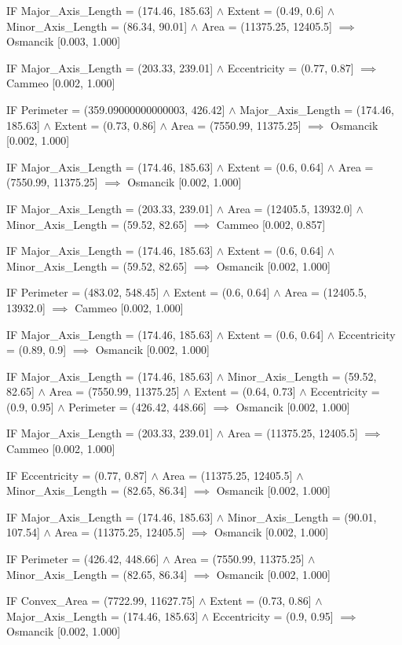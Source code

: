 IF Major\_Axis\_Length = (174.46, 185.63] $\land$ Extent = (0.49, 0.6] $\land$ Minor\_Axis\_Length = (86.34, 90.01] $\land$ Area = (11375.25, 12405.5] $\implies$ Osmancik [0.003, 1.000]

IF Major\_Axis\_Length = (203.33, 239.01] $\land$ Eccentricity = (0.77, 0.87] $\implies$ Cammeo [0.002, 1.000]

IF Perimeter = (359.09000000000003, 426.42] $\land$ Major\_Axis\_Length = (174.46, 185.63] $\land$ Extent = (0.73, 0.86] $\land$ Area = (7550.99, 11375.25] $\implies$ Osmancik [0.002, 1.000]

IF Major\_Axis\_Length = (174.46, 185.63] $\land$ Extent = (0.6, 0.64] $\land$ Area = (7550.99, 11375.25] $\implies$ Osmancik [0.002, 1.000]

IF Major\_Axis\_Length = (203.33, 239.01] $\land$ Area = (12405.5, 13932.0] $\land$ Minor\_Axis\_Length = (59.52, 82.65] $\implies$ Cammeo [0.002, 0.857]

IF Major\_Axis\_Length = (174.46, 185.63] $\land$ Extent = (0.6, 0.64] $\land$ Minor\_Axis\_Length = (59.52, 82.65] $\implies$ Osmancik [0.002, 1.000]

IF Perimeter = (483.02, 548.45] $\land$ Extent = (0.6, 0.64] $\land$ Area = (12405.5, 13932.0] $\implies$ Cammeo [0.002, 1.000]

IF Major\_Axis\_Length = (174.46, 185.63] $\land$ Extent = (0.6, 0.64] $\land$ Eccentricity = (0.89, 0.9] $\implies$ Osmancik [0.002, 1.000]

IF Major\_Axis\_Length = (174.46, 185.63] $\land$ Minor\_Axis\_Length = (59.52, 82.65] $\land$ Area = (7550.99, 11375.25] $\land$ Extent = (0.64, 0.73] $\land$ Eccentricity = (0.9, 0.95] $\land$ Perimeter = (426.42, 448.66] $\implies$ Osmancik [0.002, 1.000]

IF Major\_Axis\_Length = (203.33, 239.01] $\land$ Area = (11375.25, 12405.5] $\implies$ Cammeo [0.002, 1.000]

IF Eccentricity = (0.77, 0.87] $\land$ Area = (11375.25, 12405.5] $\land$ Minor\_Axis\_Length = (82.65, 86.34] $\implies$ Osmancik [0.002, 1.000]

IF Major\_Axis\_Length = (174.46, 185.63] $\land$ Minor\_Axis\_Length = (90.01, 107.54] $\land$ Area = (11375.25, 12405.5] $\implies$ Osmancik [0.002, 1.000]

IF Perimeter = (426.42, 448.66] $\land$ Area = (7550.99, 11375.25] $\land$ Minor\_Axis\_Length = (82.65, 86.34] $\implies$ Osmancik [0.002, 1.000]

IF Convex\_Area = (7722.99, 11627.75] $\land$ Extent = (0.73, 0.86] $\land$ Major\_Axis\_Length = (174.46, 185.63] $\land$ Eccentricity = (0.9, 0.95] $\implies$ Osmancik [0.002, 1.000]

